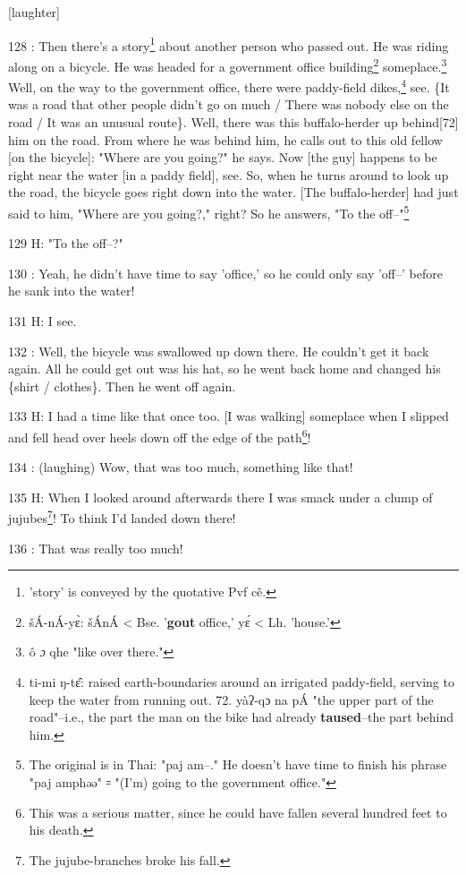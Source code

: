 [laughter]

128  : Then there's a story\footnote{'story' is conveyed by the quotative Pvf cê.} about another person who passed out. He was riding
along on a bicycle. He was headed for a government office building\footnote{šÁ-nÁ-yɛ̀: šÁnÁ < Bse. '\textbf{gout }office,' yɛ́ < Lh. 'house.'} someplace.\footnote{ô \emph{ɔ }qhe "like over there."}
Well, on the way to the government office, there were paddy-field dikes,\footnote{ti-mi ŋ-tɛ̂: raised earth-boundaries around an irrigated paddy-field, serving to keep the water from running out.  72. yàʔ-qɔ na pÁ "the upper part of the road"--i.e., the part the man on the bike had already \textbf{taused}--the part behind him.} see.
\{It was a road that other people didn't go on much / There was nobody else on
the road / It was an unusual route\}. Well, there was this buffalo-herder up behind[72]
him on the road. From where he was behind him, he calls out to this old fellow
[on the bicycle]: "Where are you going?" he says. Now [the guy]
happens to be right near the water [in a paddy field], see. So, when he turns around
to look up the road, the bicycle goes right down into the water. [The buffalo-herder]
had just said to him, "Where are you going?," right? So he answers,
"To the off--"\footnote{The original is in Thai: "paj am--." He doesn't have time to finish his phrase "paj amphəə" ꞊ "(I'm) going to the government office."}

129 H: "To the off--?"

130  : Yeah, he didn't have time to say 'office,' so he could only say 'off--'
before he sank into the water!

131 H: I see.

132  : Well, the bicycle was swallowed up down there. He couldn't get it back again.
All he could get out was his hat, so he went back home and changed his \{shirt
/ clothes\}. Then he went off again.

133 H: I had a time like that once too. [I was walking] someplace when I slipped
and fell head over heels down off the edge of the path\footnote{This was a serious matter, since he could have fallen several hundred feet to his death.}!

134  : (laughing) Wow, that was too much, something like that!

135 H: When I looked around afterwards there I was smack under a clump of jujubes\footnote{The jujube-branches broke his fall.}!
To think I'd landed down there!

136  : That was really too much!

